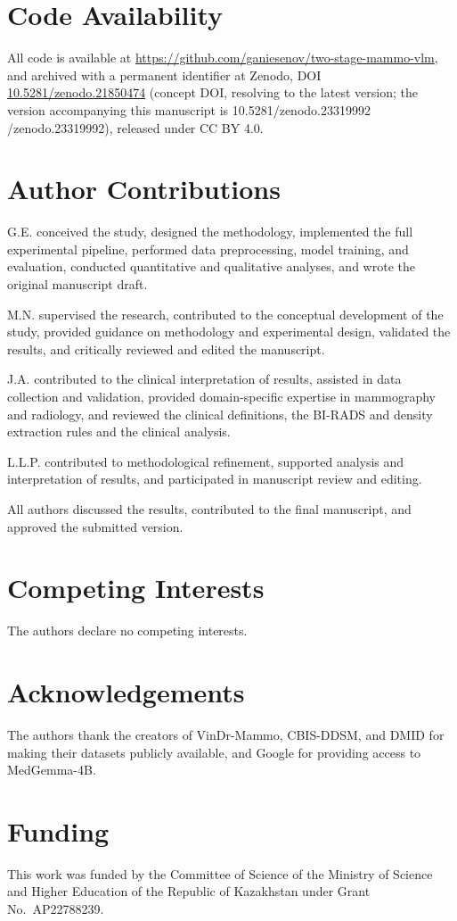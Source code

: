 \documentclass{wlscirep}
\newif\ifmarkup
\newif\ifmarkbar
\newcommand{\rev}[1]{%
  \ifmarkup
    \ifmarkbar\cbstart#1\cbend\else\textcolor{revised}{#1}\fi
  \else#1\fi}
\begin{document}
\section*{Code Availability}

All code is available at \url{https://github.com/ganiesenov/two-stage-mammo-vlm}, and archived with a permanent identifier at Zenodo, DOI \href{https://doi.org/10.5281/zenodo.21850474}{10.5281/zenodo.21850474} (concept DOI, resolving to the latest version; the version accompanying this manuscript is \rev{10.5281/zenodo.23319992}), released under CC BY 4.0.

\section*{Author Contributions}

G.E. conceived the study, designed the methodology, implemented the full experimental pipeline, performed data preprocessing, model training, and evaluation, conducted quantitative and qualitative analyses, and wrote the original manuscript draft.

M.N. supervised the research, contributed to the conceptual development of the study, provided guidance on methodology and experimental design, validated the results, and critically reviewed and edited the manuscript.

J.A. contributed to the clinical interpretation of results, assisted in data collection and validation, provided domain-specific expertise in mammography and radiology, and reviewed the clinical definitions, the BI-RADS and density extraction rules and the clinical analysis.

L.L.P. contributed to methodological refinement, supported analysis and interpretation of results, and participated in manuscript review and editing.

All authors discussed the results, contributed to the final manuscript, and approved the submitted version.

\section*{Competing Interests}

The authors declare no competing interests.

\section*{Acknowledgements}

The authors thank the creators of VinDr-Mammo, CBIS-DDSM, and DMID for making their datasets publicly available, and Google for providing access to MedGemma-4B.

\section*{Funding}

This work was funded by the Committee of Science of the Ministry of Science and Higher Education of the Republic of Kazakhstan under Grant No.\ AP22788239.


\end{document}
